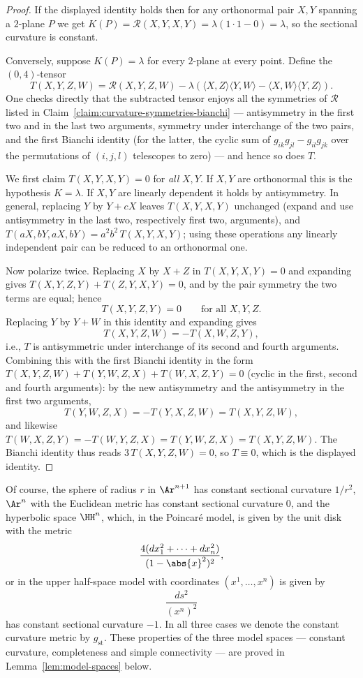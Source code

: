 \begin{proof}
\leanok
If the displayed identity holds then for any orthonormal pair $X,Y$
spanning a $2$-plane $P$ we get $K(P)={\mathcal
R}(X,Y,X,Y)=\lambda(1\cdot 1-0)=\lambda$, so the sectional curvature
is constant.

Conversely, suppose $K(P)=\lambda$ for every $2$-plane at every
point. Define the $(0,4)$-tensor
$$T(X,Y,Z,W)={\mathcal R}(X,Y,Z,W)
-\lambda\left(\langle X,Z\rangle\langle Y,W\rangle
-\langle X,W\rangle\langle Y,Z\rangle\right).$$
One checks directly that the subtracted tensor enjoys all the
symmetries of ${\mathcal R}$ listed in
Claim~\ref{claim:curvature-symmetries-bianchi} --- antisymmetry in
the first two and in the last two arguments, symmetry under
interchange of the two pairs, and the first Bianchi identity (for
the latter, the cyclic sum of
$g_{ik}g_{jl}-g_{il}g_{jk}$ over the permutations of $(i,j,l)$
telescopes to zero) --- and hence so does $T$.

We first claim $T(X,Y,X,Y)=0$ for \emph{all} $X,Y$. If $X,Y$ are
orthonormal this is the hypothesis $K=\lambda$. If $X,Y$ are
linearly dependent it holds by antisymmetry. In general, replacing
$Y$ by $Y+cX$ leaves $T(X,Y,X,Y)$ unchanged (expand and use
antisymmetry in the last two, respectively first two, arguments),
and $T(aX,bY,aX,bY)=a^2b^2\,T(X,Y,X,Y)$; using these operations any
linearly independent pair can be reduced to an orthonormal one.

Now polarize twice. Replacing $X$ by $X+Z$ in $T(X,Y,X,Y)=0$ and
expanding gives $T(X,Y,Z,Y)+T(Z,Y,X,Y)=0$, and by the pair symmetry
the two terms are equal; hence
$$T(X,Y,Z,Y)=0\qquad\text{for all }X,Y,Z.$$
Replacing $Y$ by $Y+W$ in this identity and expanding gives
$$T(X,Y,Z,W)=-T(X,W,Z,Y),$$
i.e., $T$ is antisymmetric under interchange of its second and
fourth arguments. Combining this with the first Bianchi identity in
the form $T(X,Y,Z,W)+T(Y,W,Z,X)+T(W,X,Z,Y)=0$ (cyclic in the first,
second and fourth arguments): by the new antisymmetry and the
antisymmetry in the first two arguments,
$$T(Y,W,Z,X)=-T(Y,X,Z,W)=T(X,Y,Z,W),$$
and likewise $T(W,X,Z,Y)=-T(W,Y,Z,X)=T(Y,W,Z,X)=T(X,Y,Z,W)$. The
Bianchi identity thus reads $3\,T(X,Y,Z,W)=0$, so $T\equiv 0$, which
is the displayed identity.
\end{proof}

Of course, the sphere of
radius $r$ in $\Ar^{n+1}$ has constant sectional curvature $1/r^2$,
$\Ar^n$ with the Euclidean metric has constant sectional curvature
$0$, and the hyperbolic space $\HH^n$, which, in the
Poincar\'e model, is given by the unit disk with the metric
$$\frac{4(dx^{2}_{1}+\cdots+
dx^{2}_{n})}{(1-\abs{x}^{2})^{2}},$$ or in the upper half-space
model with coordinates $(x^1,\ldots,x^n)$ is given by
$$\frac{ds^2}{(x^n)^2}$$ has constant sectional curvature $-1$. In all
three cases we denote the constant curvature metric by $g_\mathrm{st}$.
These properties of the three model spaces --- constant curvature,
completeness and simple connectivity --- are proved in
Lemma~\ref{lem:model-spaces} below.


